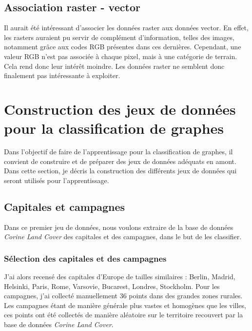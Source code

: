
\subsection{Association raster - vector}

Il aurait été intéressant d'associer les données raster aux données vector.
En effet, les rasters auraient pu servir de complément d'information, telles des images, notamment grâce aux codes RGB présentes dans ces dernières.
Cependant, une valeur RGB n'est pas associée à chaque pixel, mais à une catégorie de terrain.
Cela rend donc leur intérêt moindre.
Les données raster ne semblent donc finalement pas intéressante à exploiter.



\section{Construction des jeux de données pour la classification de graphes}


Dans l'objectif de faire de l'apprentissage pour la classification de graphes, il convient de construire et de préparer des jeux de données adéquats en amont.
Dans cette section, je décris la construction des différents jeux de données qui seront utilisés pour l'apprentissage.

\subsection{Capitales et campagnes}

Dans ce premier jeu de données, nous voulons extraire de la base de données \emph{Corine Land Cover} des capitales et des campagnes, dans le but de les classifier.

\subsubsection{Sélection des capitales et des campagnes}

J'ai alors recensé des capitales d'Europe de tailles similaires : Berlin, Madrid, Helsinki, Paris, Rome, Varsovie, Bucarest, Londres, Stockholm.
Pour les campagnes, j'ai collecté manuellement 36 points dans des grandes zones rurales.
Les campagnes étant de manière générale plus vastes et homogènes que les villes, ces points ont été collectés de manière aléatoire sur le territoire recouvert par la base de données \emph{Corine Land Cover}.

